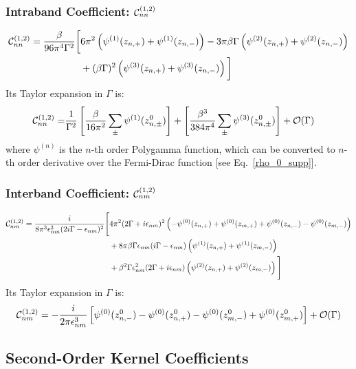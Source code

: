 \documentclass[twocolumn, prx, reprint, amsfonts, amsmath, amssymb, longbibliography, floatfix, aps]{revtex4-2}
\begin{document}
\subsubsection{Intraband Coefficient: \texorpdfstring{${\cal C}_{nn}^{(1, 2)}$}{Cnn}}
\begin{align}
{\cal C}_{nn}^{(1, 2)} = \frac{\beta}{96 \pi^4 \Gamma^2} \bigg[ & 6 \pi^2 \left(\psi^{(1)}(z_{n,+}) + \psi^{(1)}(z_{n,-})\right) - 3 \pi \beta \Gamma \left(\psi^{(2)}(z_{n,+}) + \psi^{(2)}(z_{n,-})\right) 
\nonumber \\
& + (\beta \Gamma)^2 \left(\psi^{(3)}(z_{n,+}) + \psi^{(3)}(z_{n,-})\right) \bigg]
\end{align}
Its Taylor expansion in $\Gamma$ is:
\begin{align}
{\cal C}_{nn}^{(1, 2)} = & \frac{1}{\Gamma^2} \left[ \frac{\beta}{16\pi^2} \sum_{\pm} \psi^{(1)}(z_{n,\pm}^0) \right] + \left[ \frac{\beta^3}{384\pi^4} \sum_{\pm} \psi^{(3)}(z_{n,\pm}^0) \right] + {\cal O}(\Gamma)
\end{align}
where $\psi^{(n)}$ is the $n$-th order Polygamma function, which can be converted to $n$-th order derivative over the Fermi-Dirac function [see Eq.~\eqref{rho_0_supp}].

\subsubsection{Interband Coefficient: \texorpdfstring{${\cal C}_{nm}^{(1, 2)}$}{Cnm}}
\begin{align}
{\cal C}_{nm}^{(1, 2)} = \frac{i}{8 \pi^3 \epsilon_{nm}^3 (2 i\Gamma - \epsilon_{nm})^2} \Bigg[
& 4 \pi^2 (2 \Gamma + i \epsilon_{nm})^2 \left( - \psi^{(0)}(z_{n,+}) + \psi^{(0)}(z_{m,+}) + \psi^{(0)}(z_{n,-}) - \psi^{(0)}(z_{m,-}) \right) \nonumber \\
& + 8 \pi \beta \Gamma \epsilon_{nm} (i \Gamma - \epsilon_{nm}) \left( \psi^{(1)}(z_{n,+}) + \psi^{(1)}(z_{m,-}) \right) \nonumber \\
& + \beta^2 \Gamma \epsilon_{nm}^2 (2 \Gamma + i \epsilon_{nm}) \left( \psi^{(2)}(z_{n,+}) + \psi^{(2)}(z_{m,-}) \right)
\Bigg]
\end{align}
Its Taylor expansion in $\Gamma$ is:
\begin{align}
{\cal C}_{nm}^{(1, 2)} = -\frac{i}{2\pi \epsilon_{nm}^3} \left[ \psi^{(0)}(z_{n,-}^0) - \psi^{(0)}(z_{n,+}^0) - \psi^{(0)}(z_{m,-}^0) + \psi^{(0)}(z_{m,+}^0) \right] + {\cal O}(\Gamma)
\end{align}

\subsection{Second-Order Kernel Coefficients}
\end{document}
